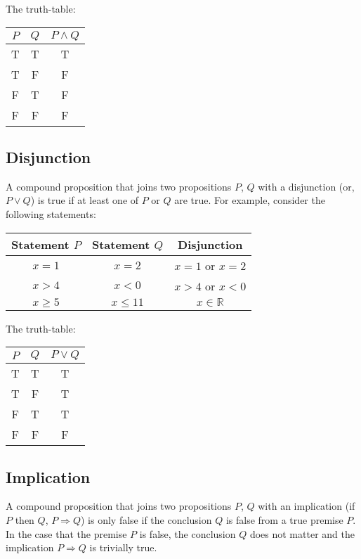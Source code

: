 \documentclass[11pt, a4paper, oneside]{exam}
\theoremstyle{definition}\newtheorem{define}{Definition}[section]
\theoremstyle{remark}\newtheorem{remark}{Remark}
\theoremstyle{definition}\newtheorem{example}{Example}[subsection]
\theoremstyle{definition}\newtheorem{notation}{Notation}[section]
\theoremstyle{definition}\newtheorem{theorem}{Theorem}[section]
\theoremstyle{definition}\newtheorem{corollary}{Corollary}[section]
\begin{document}
The truth-table:
\begin{center}
	\begin{tabular}{|c|c|c|} \hline
		$P$ & $Q$ & $P \land Q$\\ \hline
		T & T & T\\
		T & F & F\\
		F & T & F\\
		F & F & F\\ \hline
	\end{tabular}
\end{center}


\subsection{Disjunction}
A compound proposition that joins two propositions $P$, $Q$ with a disjunction (or, $P\lor Q$) is true if at least one of $P$ or $Q$ are true. For example, consider the following statements:

\begin{center}
	\begin{tabular}{c|c|c}
		Statement $P$ & Statement $Q$ & Disjunction\\ \hline
		$x=1$ & $x=2$ & $x=1$ or $x=2$\\
		$x > 4$ & $x<0$ & $x>4$ or $x <0$\\
		$x \geq 5$ & $x \leq 11$ & $x \in \mathbb{R}$
	\end{tabular}
\end{center}

The truth-table:

\begin{center}
	\begin{tabular}{|c|c|c|}\hline
		$P$ & $Q$ & $P \lor Q$\\ \hline
		T & T & T\\
		T & F & T\\
		F & T & T\\
		F & F & F\\ \hline
	\end{tabular}
\end{center}

\subsection{Implication}
A compound proposition that joins two propositions $P$, $Q$ with an implication (if $P$ then $Q$, $P \Rightarrow Q$) is only false if the conclusion $Q$ is false from a true premise $P$. In the case that the premise $P$ is false, the conclusion $Q$ does not matter and the implication $P \Rightarrow Q$ is trivially true.
\end{document}
